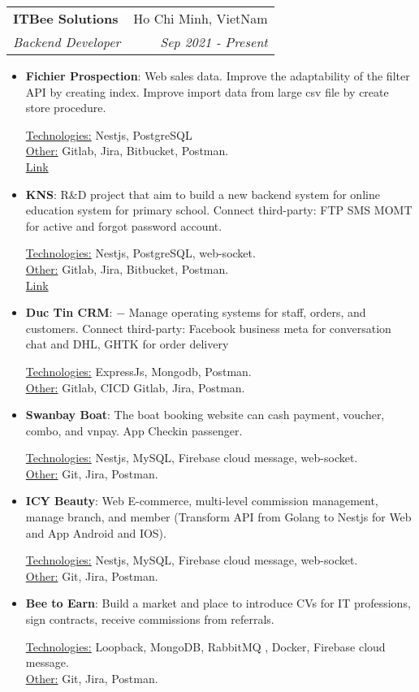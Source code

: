 \documentclass[letterpaper,11pt]{article}
\makeatletter
\newcommand{\resumeItem}[2]{
  \item\small{
    \textbf{#1}{: #2 \vspace{-2pt}}\\
  }
}
\newcommand{\resumeSubheading}[4]{
  \vspace{-1pt}\item
    \begin{tabular*}{0.97\textwidth}[t]{l@{\extracolsep{\fill}}r}
      \textbf{#1} & #2 \\
      \textit{\small#3} & \textit{\small #4} \\
    \end{tabular*}\vspace{-5pt}
}
\newcommand{\resumeSubSubheading}[2]{
    \begin{tabular*}{0.97\textwidth}{l@{\extracolsep{\fill}}r}
      \textit{\small#1} & \textit{\small #2} \\
    \end{tabular*}\vspace{-5pt}
}
\newcommand{\resumeSubHeadingListEnd}{\end{itemize}}
\newcommand{\resumeItemListStart}{\begin{itemize}}
\newcommand{\resumeItemListEnd}{\end{itemize}\vspace{-5pt}}
\newcommand{\resumeTech}[2]{
 \underline{#1:} #2\\
}
\newcommand{\resumeOther}[2]{
 \underline{#1:} #2\\
}
\makeatother
\begin{document}
    \resumeSubheading
      {ITBee Solutions}{Ho Chi Minh, VietNam}
      {Backend Developer}{Sep 2021 - Present}
      \resumeItemListStart
        \resumeItem{Fichier Prospection}
          {Web sales data. Improve the adaptability of the filter API by creating index. Improve import data from large csv file by create store procedure.}
          \resumeTech{Technologies}{Nestjs, PostgreSQL}
          \resumeOther{Other}{Gitlab, Jira, Bitbucket, Postman.}
          \href{https://fichier-prospection.online/}{Link}
        \resumeItem{KNS}
          {R\&D project that aim to build a new backend system for online education system for primary school. Connect third-party: FTP SMS MOMT for active and forgot password account.}
          \resumeTech{Technologies}{Nestjs, PostgreSQL, web-socket.}
          \resumeOther{Other}{Gitlab, Jira, Bitbucket, Postman.}
          \href{https://sanchoikns.vn/skills}{Link}
        \resumeItem{Duc Tin CRM}
          {−	Manage operating systems for staff, orders, and customers. Connect third-party: Facebook business meta for conversation chat and DHL, GHTK for order delivery}
          \resumeTech{Technologies}{ExpressJs, Mongodb, Postman.}
          \resumeOther{Other}{Gitlab, CICD Gitlab, Jira, Postman.}
        \resumeItem{Swanbay Boat}
          {The boat booking website can cash payment, voucher, combo, and vnpay. App Checkin passenger.}
          \resumeTech{Technologies}{Nestjs, MySQL, Firebase cloud message, web-socket.}
          \resumeOther{Other}{Git, Jira, Postman.}
        \resumeItem{ICY Beauty}
          {Web E-commerce, multi-level commission management, manage branch, and member (Transform API from Golang to Nestjs for Web and App Android and IOS).}
          \resumeTech{Technologies}{Nestjs, MySQL, Firebase cloud message, web-socket.}
          \resumeOther{Other}{Git, Jira, Postman.}
        \resumeItem{Bee to Earn}
          {Build a market and place to introduce CVs for IT professions, sign contracts, receive commissions from referrals.}
          \resumeTech{Technologies}{Loopback,  MongoDB, RabbitMQ , Docker, Firebase cloud message.}
          \resumeOther{Other}{Git, Jira, Postman.}
      \resumeItemListEnd
      
\end{document}
